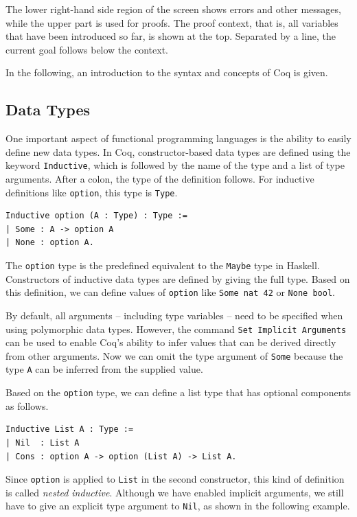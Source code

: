 \documentclass[a4paper, 11pt, fleqn, twoside]{scrreprt}
\newcommand{\hinl}[1]{\texttt{#1}}
\newcommand{\cinl}[1]{\texttt{#1}}
\begin{document}
The lower right-hand side region of the screen shows errors and other messages, while the upper part is used for proofs.
The proof context, that is, all variables that have been introduced so far, is shown at the top.
Separated by a line, the current goal follows below the context.

In the following, an introduction to the syntax and concepts of Coq is given.

\subsection{Data Types}
\label{subsec:coqdatatypes}
One important aspect of functional programming languages is the ability to easily define new data types.
In Coq, constructor-based data types are defined using the keyword \cinl{Inductive}, which is followed by the name of the type and a list of type arguments.
After a colon, the type of the definition follows.
For inductive definitions like \cinl{option}, this type is \cinl{Type}.

\begin{verbatim}
Inductive option (A : Type) : Type := 
| Some : A -> option A 
| None : option A.
\end{verbatim}

The \cinl{option} type is the predefined equivalent to the \hinl{Maybe} type in Haskell.
Constructors of inductive data types are defined by giving the full type.
Based on this definition, we can define values of \cinl{option} like \cinl{Some nat 42} or \cinl{None bool}.

By default, all arguments -- including type variables -- need to be specified when using polymorphic data types.
However, the command \cinl{Set Implicit Arguments} can be used to enable Coq's ability to infer values that can be derived directly from other arguments.
Now we can omit the type argument of \cinl{Some} because the type \cinl{A} can be inferred from the supplied value.

Based on the \cinl{option} type, we can define a list type that has optional components as follows.
\begin{verbatim}
Inductive List A : Type :=
| Nil  : List A
| Cons : option A -> option (List A) -> List A.
\end{verbatim}

Since \cinl{option} is applied to \cinl{List} in the second constructor, this kind of definition is called \textit{nested inductive}.
Although we have enabled implicit arguments, we still have to give an explicit type argument to \cinl{Nil}, as shown in the following example.
\end{document}
